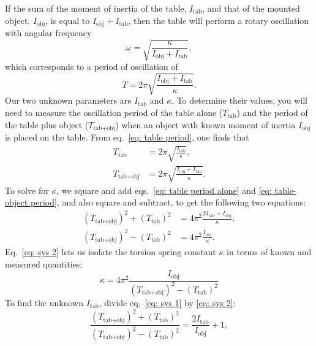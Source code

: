 \documentclass[addpoints]{physlabs}
\begin{document}
\begin{labsection}
If the sum of the moment of inertia of the table, $I_\text{tab}$, and that of the mounted object, $I_\text{obj}$, is equal to
$I_\text{obj} + I_\text{tab}$, then the table will perform a rotary oscillation with angular frequency
%
\begin{equation}\label{eq: table frequency}
    \omega = \sqrt{\frac{\kappa}{I_\text{obj} + I_\text{tab}}},
\end{equation}
%
which corresponds to a period of oscillation of
%
\begin{equation}\label{eq: table period}
    T = 2\pi\sqrt{\frac{I_\text{obj} + I_\text{tab}}{\kappa}}.
\end{equation}
%
Our two unknown parameters are $I_\text{tab}$ and $\kappa$. To determine their values, you will need to measure the oscillation period of the table alone ($T_\text{tab}$) and the period of the table plus object ($T_{\text{tab}+\text{obj}}$) when an object with known moment of inertia $I_\text{obj}$ is placed on the table. From eq.~\ref{eq: table period}, one finds that
%
\begin{align}
    T_\text{tab} &= 2\pi\sqrt{\frac{I_\text{tab}}{\kappa}} \label{eq: table period alone},
    \\
    T_{\text{tab} + \text{obj}} &= 2\pi\sqrt{\frac{I_\text{obj} + I_\text{tab}}{\kappa}} \label{eq: table-object period}.
\end{align}
%
To solve for $\kappa$, we square and add  eqs.~\ref{eq: table period alone} and \ref{eq: table-object period}, and also square and subtract, to get the following two equations:
%
\begin{align}
    (T_{\text{tab} + \text{obj}})^2 + (T_{\text{tab}})^2 &= 4\pi^2 \frac{2I_\text{tab} + I_\text{obj}}{\kappa} \label{eq: sys 1},
    \\
    (T_{\text{tab} + \text{obj}})^2 - (T_{\text{tab}})^2 &= 4\pi^2 \frac{I_\text{obj}}{\kappa} \label{eq: sys 2}.
\end{align}
%
Eq.~\ref{eq: sys 2} lets us isolate the torsion spring constant $\kappa$ in terms of known and measured quantities:
%
\begin{equation}\label{eq: torsion constant}
    \boxed{\kappa = 4\pi^2 \frac{I_\text{obj}}{(T_{\text{tab} + \text{obj}})^2 - (T_{\text{tab}})^2}}
\end{equation}
%
To find the unknown $I_\text{tab}$, divide eq.~\ref{eq: sys 1} by \ref{eq: sys 2}:
%
\begin{equation}\label{eq: sys 3}
    \frac{(T_{\text{tab} + \text{obj}})^2 + (T_{\text{tab}})^2}{(T_{\text{tab} + \text{obj}})^2 - (T_{\text{tab}})^2} = \frac{2I_\text{tab}}{I_\text{obj}} + 1,

\end{equation}
\end{labsection}
\end{document}
